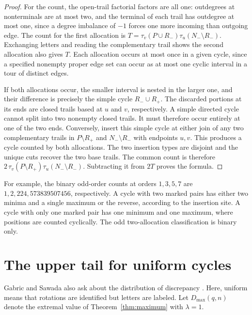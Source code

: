 \documentclass[11pt]{article}
\begin{document}
\begin{proof}
For the count, the open-trail factorial factors are all one:
outdegrees at nonterminals are at most two, and the terminal
of each trail has outdegree at most one, since a degree
imbalance of \(-1\) forces one more incoming than outgoing
edge. The count for the first allocation is
\(T=\tau_v(P\cup R_-)\tau_u(N_-\setminus R_-)\).
Exchanging letters and reading the complementary trail shows
the second allocation also gives \(T\). Each allocation
occurs at most once in a given cycle, since a specified
nonempty proper edge set can occur as at most one cyclic
interval in a tour of distinct edges.

If both allocations occur, the smaller interval is nested in
the larger one, and their difference is precisely the simple
cycle \(R_-\cup R_+\). The discarded portions at its ends
are closed trails based at \(u\) and \(v\), respectively.
A simple directed cycle cannot split into two nonempty closed
trails. It must therefore occur entirely at one of the two
ends. Conversely, insert this simple cycle at either join of
any two complementary trails in \(P\setminus R_+\) and
\(N_-\setminus R_-\) with endpoints \(u,v\). This produces a
cycle counted by both allocations. The two insertion types
are disjoint and the unique cuts recover the two base trails.
The common count is therefore
\(2\,\tau_v(P\setminus R_+)\tau_u(N_-\setminus R_-)\).
Subtracting it from \(2T\) proves the formula.
\end{proof}

For example, the binary odd-order counts at orders \(1,3,5,7\)
are \(1,2,224,573839507456\), respectively. A cycle with
two marked pairs has either two minima and a single maximum
or the reverse, according to the insertion site. A cycle
with only one marked pair has one minimum and one maximum,
where positions are counted cyclically. The odd two-allocation
classification is binary only.

\section{The upper tail for uniform cycles}

Gabric and Sawada also ask about the distribution of discrepancy
\cite[Section 7, item 6]{GabricSawada}. Here, uniform means that rotations
are identified but letters are labeled. Let \(D_{\max}(q,n)\)
denote the extremal value of Theorem~\ref{thm:maximum} with \(\lambda=1\).
\end{document}
